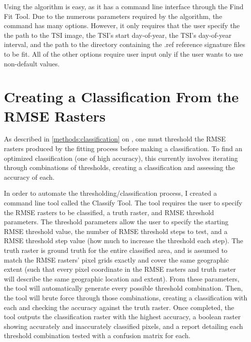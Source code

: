 Using the algorithm is easy, as it has a command line interface through the Find Fit Tool. Due to the numerous parameters required by the algorithm, the command has many options. However, it only requires that the user specify the the path to the TSI image, the TSI's start day-of-year, the TSI's day-of-year interval, and the path to the directory containing the .ref reference signature files to be fit. All of the other options require user input only if the user wants to use non-default values.


\section{Creating a Classification From the RMSE Rasters}
\label{appendix:tools:classify}

As described in \autoref{methods:classification} on , one must threshold the RMSE rasters produced by the fitting process before making a classification. To find an optimized classification (one of high accuracy), this currently involves iterating through combinations of thresholds, creating a classification and assessing the accuracy of each.

In order to automate the thresholding/classification process, I created a command line tool called the Classify Tool. The tool requires the user to specify the RMSE rasters to be classified, a truth raster, and RMSE threshold parameters. The threshold parameters allow the user to specify the starting RMSE threshold value, the number of RMSE threshold steps to test, and a RMSE threshold step value (how much to increase the threshold each step). The truth raster is ground truth for the entire classified area, and is assumed to match the RMSE rasters’ pixel grids exactly and cover the same geographic extent (such that every pixel coordinate in the RMSE rasters and truth raster will describe the same geographic location and extent). From these parameters, the tool will automatically generate every possible threshold combination. Then, the tool will brute force through those combinations, creating a classification with each and checking the accuracy against the truth raster. Once completed, the tool outputs the classification raster with the highest accuracy, a boolean raster showing accurately and inaccurately classified pixels, and a report detailing each threshold combination tested with a confusion matrix for each.